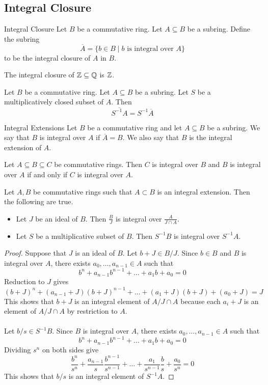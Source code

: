 \documentclass[a4paper]{article}
\begin{document}
\subsection{Integral Closure}
\begin{defn}{Integral Closure}{} Let $B$ be a commutative ring. Let $A\subseteq B$ be a subring. Define the subring $$\overline{A}=\{b\in B\;|\;b\text{ is integral over }A\}$$ to be the integral closure of $A$ in $B$. 
\end{defn}

\begin{eg}{}{} The integral closure of $\mathbb{Z}\subseteq\mathbb{Q}$ is $\mathbb{Z}$. 
\end{eg}

\begin{prp}{}{} Let $B$ be a commutative ring. Let $A\subseteq B$ be a subring. Let $S$ be a multiplicatively closed subset of $A$. Then $$\overline{S^{-1}A}=S^{-1}\overline{A}$$
\end{prp}

\begin{defn}{Integral Extensions}{} Let $B$ be a commutative ring and let $A\subseteq B$ be a subring. We say that $B$ is integral over $A$ if $\overline{A}=B$. We also say that $B$ is the integral extension of $A$. 
\end{defn}

\begin{lmm}{}{} Let $A\subseteq B\subseteq C$ be commutative rings. Then $C$ is integral over $B$ and $B$ is integral over $A$ if and only if $C$ is integral over $A$. 
\end{lmm}

\begin{prp}{}{} Let $A,B$ be commutative rings such that $A\subset B$ is an integral extension. Then the following are true. 
\begin{itemize}
\item Let $J$ be an ideal of $B$. Then $\frac{B}{J}$ is integral over $\frac{A}{J\cap A}$. 
\item Let $S$ be a multiplicative subset of $B$. Then $S^{-1}B$ is integral over $S^{-1}A$. 
\end{itemize} 
\begin{proof}
Suppose that $J$ is an ideal of $B$. Let $b+J\in B/J$. Since $b\in B$ and $B$ is integral over $A$, there exists $a_0,\dots,a_{n-1}\in A$ such that $$b^n+a_{n-1}b^{n-1}+\dots+a_1b+a_0=0$$ Reduction to $J$ gives $$(b+J)^n+(a_{n-1}+J)(b+J)^{n-1}+\dots+(a_1+J)(b+J)+(a_0+J)=J$$ This shows that $b+J$ is an integral element of $A/J\cap A$ because each $a_i+J$ is an element of $A/J\cap A$ by restriction to $A$. \\~\\

Let $b/s\in S^{-1}B$. Since $B$ is integral over $A$, there exists $a_0,\dots,a_{n-1}\in A$ such that $$b^n+a_{n-1}b^{n-1}+\dots+a_1b+a_0=0$$ Dividing $s^n$ on both sides give $$\frac{b^n}{s^n}+\frac{a_{n-1}}{s}\frac{b^{n-1}}{s^{n-1}}+\dots+\frac{a_1}{s^{n-1}}\frac{b}{s}+\frac{a_0}{s^n}=0$$ This shows that $b/s$ is an integral element of $S^{-1}A$. 
\end{proof}
\end{prp}
\end{document}
